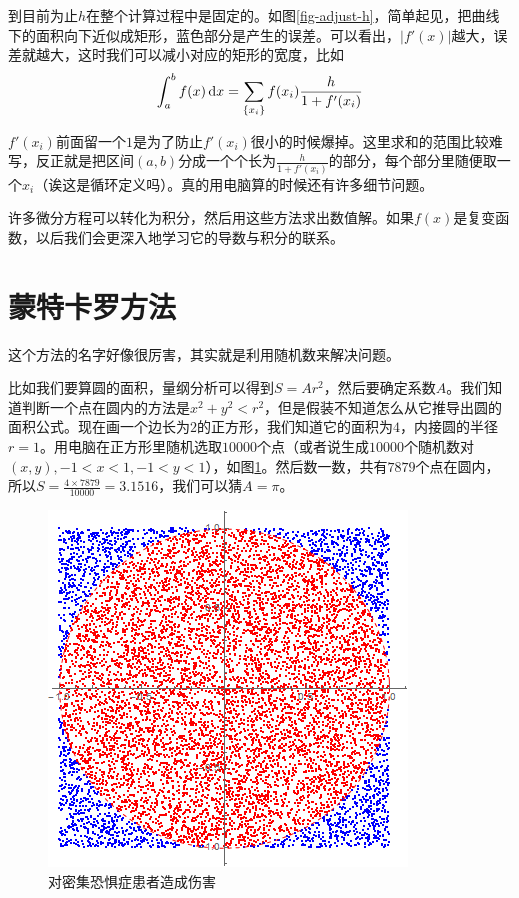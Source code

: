 到目前为止$h$在整个计算过程中是固定的。如图\ref{fig-adjust-h}，简单起见，把曲线下的面积向下近似成矩形，蓝色部分是产生的误差。可以看出，$|f'(x)|$越大，误差就越大，这时我们可以减小对应的矩形的宽度，比如
\begin{equation*}
\int_a^b f(x) \mathop{}\!\mathrm{d} x=\sum_{\{x_i\}} f(x_i) \frac{h}{1+f'(x_i)}
\end{equation*}

$f'(x_i)$前面留一个$1$是为了防止$f'(x_i)$很小的时候爆掉。这里求和的范围比较难写，反正就是把区间$(a,b)$分成一个个长为$\frac{h}{1+f'(x_i)}$的部分，每个部分里随便取一个$x_i$（诶这是循环定义吗）。真的用电脑算的时候还有许多细节问题。

许多微分方程可以转化为积分，然后用这些方法求出数值解。如果$f(x)$是复变函数，以后我们会更深入地学习它的导数与积分的联系。
\section{蒙特卡罗方法}
这个方法的名字好像很厉害，其实就是利用随机数来解决问题。

比如我们要算圆的面积，量纲分析可以得到$S=A r^2$，然后要确定系数$A$。我们知道判断一个点在圆内的方法是$x^2+y^2<r^2$，但是假装不知道怎么从它推导出圆的面积公式。现在画一个边长为$2$的正方形，我们知道它的面积为$4$，内接圆的半径$r=1$。用电脑在正方形里随机选取$10000$个点（或者说生成$10000$个随机数对$(x,y),-1<x<1,-1<y<1$），如图\ref{fig-monte-carlo-circle}。然后数一数，共有$7879$个点在圆内，所以$S=\frac{4 \times 7879}{10000}=3.1516$，我们可以猜$A=\pi$。
\begin{figure}[htb]
\centering
\includegraphics[scale=0.5]{fig/monte-carlo-circle.png}
\caption{对密集恐惧症患者造成伤害}
\label{fig-monte-carlo-circle}
\end{figure}

